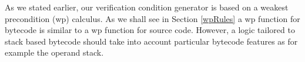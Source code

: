 As we stated earlier, our verification condition generator is based on a weakest precondition (wp) calculus. As we shall see in Section  \ref{wpRules}
a wp function for bytecode is similar to a wp function for source code. However, a logic tailored to stack based bytecode should take into account 
particular bytecode features as for example the operand stack.

 





 
